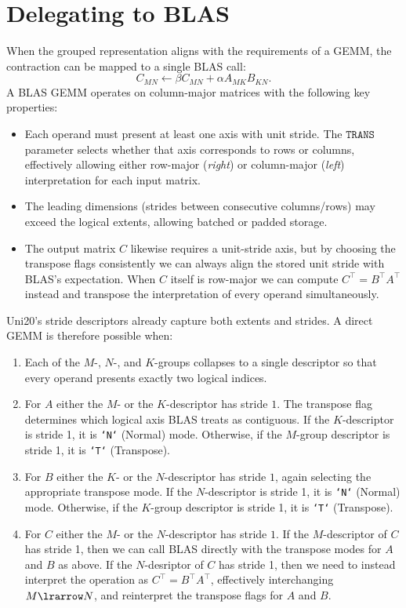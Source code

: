 \documentclass[11pt]{article}
\begin{document}
\section{Delegating to BLAS}
When the grouped representation aligns with the requirements of a GEMM, the contraction can be
mapped to a single BLAS call:
\begin{equation}
  C_{MN} \gets \beta C_{MN} + \alpha A_{MK} B_{KN}.
\end{equation}
A BLAS GEMM operates on column-major matrices with the following key properties:
\begin{itemize}
  \item Each operand must present at least one axis with unit stride.  The $\texttt{TRANS}$
        parameter selects whether that axis corresponds to rows or columns, effectively allowing
        either row-major (\emph{right}) or column-major (\emph{left}) interpretation for each input matrix.
  \item The leading dimensions (strides between consecutive columns/rows) may exceed the logical
        extents, allowing batched or padded storage.
  \item The output matrix $C$ likewise requires a unit-stride axis, but by choosing the transpose
        flags consistently we can always align the stored unit stride with BLAS's expectation.  When
        $C$ itself is row-major we can compute $C^\top = B^\top A^\top$ instead and transpose the
        interpretation of every operand simultaneously.
\end{itemize}
Uni20's stride descriptors already capture both extents and strides.  A direct GEMM is therefore
possible when:
\begin{enumerate}
  \item Each of the $M$-, $N$-, and $K$-groups collapses to a single descriptor so that every
        operand presents exactly two logical indices.
  \item For $A$ either the $M$- or the $K$-descriptor has stride $1$.  The transpose flag determines
        which logical axis BLAS treats as contiguous. If the $K$-descriptor is stride 1, it is \texttt{`N`} (Normal)
        mode. Otherwise, if the $M$-group descriptor is stride 1, it is \texttt{`T`} (Transpose).
  \item For $B$ either the $K$- or the $N$-descriptor has stride $1$, again selecting the appropriate
        transpose mode. If the $N$-descriptor is stride 1, it is \texttt{`N`} (Normal)
        mode. Otherwise, if the $K$-group descriptor is stride 1, it is \texttt{`T`} (Transpose).
  \item For $C$ either the $M$- or the $N$-descriptor has stride $1$.  If the $M$-descriptor of $C$ has
        stride 1, then we can call BLAS directly with the transpose modes for $A$ and $B$ as above.
        If the $N$-desriptor of $C$ has stride 1, then we need to instead interpret the operation as
        $C^\top = B^\top A^\top$, effectively interchanging $M \lrarrow N$, and reinterpret the transpose
        flags for $A$ and $B$.
\end{enumerate}
\end{document}
